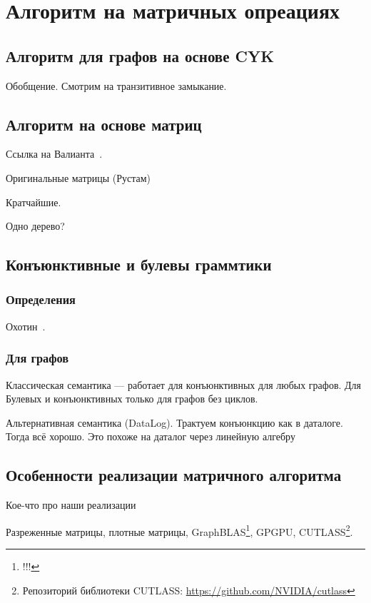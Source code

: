 \section{Алгоритм на матричных опреациях}

\subsection{Алгоритм для графов на основе CYK}

Обобщение. 
Смотрим на транзитивное замыкание.

\subsection{Алгоритм на основе матриц}

Ссылка на Валианта~\cite{!!!}.

Оригинальные матрицы (Рустам)~\cite{Azimov:2018:CPQ:3210259.3210264}

Кратчайшие.

Одно дерево?

\subsection{Конъюнктивные и булевы граммтики}

\subsubsection{Определения}

Охотин~\cite{!!!}.

\subsubsection{Для графов}

Классическая семантика --- работает для конъюнктивных для любых графов.
Для Булевых и конъюнктивных только для графов без циклов.

Альтернативная семантика (DataLog).
Трактуем конъюнкцию как в даталоге. Тогда всё хорошо.
Это похоже на даталог через линейную алгебру~\cite{!!!}

\subsection{Особенности реализации матричного алгоритма}

Кое-что про наши реализации~\cite{Mishin:2019:ECP:3327964.3328503}

Разреженные матрицы, плотные матрицы, GraphBLAS\footnote{!!!}, GPGPU, CUTLASS\footnote{Репозиторий библиотеки CUTLASS: \url{https://github.com/NVIDIA/cutlass}}.

